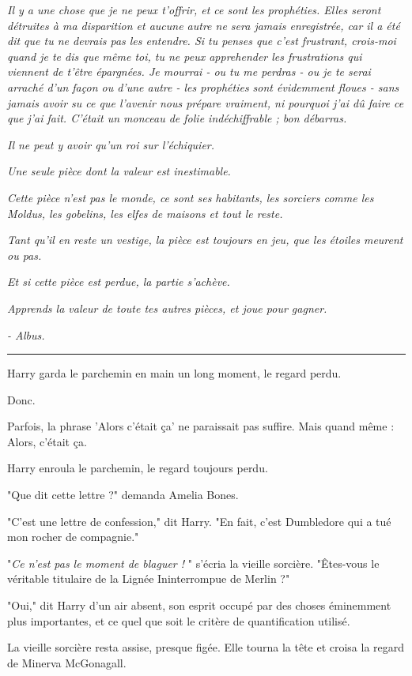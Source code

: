 \emph{Il y a une chose que je ne peux t'offrir, et ce sont les prophéties. Elles seront détruites à ma disparition et aucune autre ne sera jamais enregistrée, car il a été dit que tu ne devrais pas les entendre. Si tu penses que c'est frustrant, crois-moi quand je te dis que même toi, tu ne peux apprehender les frustrations qui viennent de t'être épargnées. Je mourrai - ou tu me perdras - ou je te serai arraché d'un façon ou d'une autre - les prophéties sont évidemment floues - sans jamais avoir su ce que l'avenir nous prépare vraiment, ni pourquoi j'ai dû faire ce que j'ai fait. C'était un monceau de folie indéchiffrable ; bon débarras.} 

\emph{Il ne peut y avoir qu'un roi sur l'échiquier.} 

\emph{Une seule pièce dont la valeur est inestimable.} 

\emph{Cette pièce n'est pas le monde, ce sont ses habitants, les sorciers comme les Moldus, les gobelins, les elfes de maisons et tout le reste.} 

\emph{Tant qu'il en reste un vestige, la pièce est toujours en jeu, que les étoiles meurent ou pas.} 

\emph{Et si cette pièce est perdue, la partie s'achève.} 

\emph{Apprends la valeur de toute tes autres pièces, et joue pour gagner.} 

\emph{- Albus.} 
\par\noindent\rule{\textwidth}{0.4pt}
Harry garda le parchemin en main un long moment, le regard perdu.

Donc.

Parfois, la phrase 'Alors c'était ça' ne paraissait pas suffire. Mais quand même : Alors, c'était ça.

Harry enroula le parchemin, le regard toujours perdu.

"Que dit cette lettre ?" demanda Amelia Bones.

"C'est une lettre de confession," dit Harry. "En fait, c'est Dumbledore qui a tué mon rocher de compagnie."

"\emph{Ce n'est pas le moment de blaguer !} " s'écria la vieille sorcière. "Êtes-vous le véritable titulaire de la Lignée Ininterrompue de Merlin ?"

"Oui," dit Harry d'un air absent, son esprit occupé par des choses éminemment plus importantes, et ce quel que soit le critère de quantification utilisé.

La vieille sorcière resta assise, presque figée. Elle tourna la tête et croisa la regard de Minerva McGonagall.

